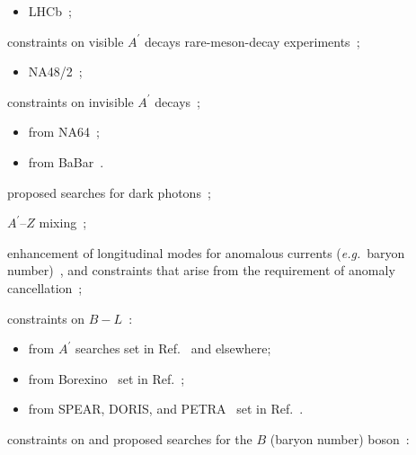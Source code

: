 \documentclass[a4paper,11pt]{article}
\def\aprime{\ensuremath{A^{\prime}}\xspace}
\begin{document}
\begin{list}{--}{\leftmargin=1em}
\begin{itemize}
    \item LHCb~\cite{Aaij:2017rft};
  \end{itemize}
  \item constraints on visible \aprime decays rare-meson-decay experiments~\cite{Bernardi:1985ny,MeijerDrees:1992kd,Archilli:2011zc,Gninenko:2011uv,Babusci:2012cr,Adlarson:2013eza,Agakishiev:2013fwl,Adare:2014mgk,Batley:2015lha,KLOE:2016lwm};
  \begin{itemize}
    \item NA48/2~\cite{Batley:2015lha};
  \end{itemize}
  \item constraints on invisible \aprime decays~\cite{Essig:2013vha,Davoudiasl:2014kua,Banerjee:2016tad,Lees:2017lec,Adler:2001xv,Adler:2004hp,Artamonov:2009sz,Banerjee:2017hhz};
    \begin{itemize}
      \item from NA64~\cite{Banerjee:2017hhz};
      \item from BaBar~\cite{Lees:2017lec}.
    \end{itemize}
  \item proposed searches for dark photons~\cite{Essig:2010xa,Freytsis:2009bh,Balewski:2013oza,Wojtsekhowski:2012zq,Beranek:2013yqa,Raggi:2014zpa,Echenard:2014lma,Battaglieri:2014hga,Alekhin:2015byh,Gardner:2015wea,Ilten:2015hya,Curtin:2014cca,He:2017ord,Kozaczuk:2017per,Ilten:2016tkc,Feng:2017uoz,Alexander:2017rfd};
  \item \aprime--$Z$ mixing~\cite{Barello:2015bhq,Cassel:2009pu,Cline:2014dwa};
  \item enhancement of longitudinal modes for anomalous currents ({\em e.g.}\ baryon number)~\cite{Dror:2017nsg,Dror:2017ehi,Ismail:2017fgq}, and constraints that arise from the requirement of anomaly cancellation~\cite{Dobrescu:2014fca};
  \item constraints on $B-L$~\cite{Bellini:2011rx,Harnik:2012ni,Carlson:1986cu,Frugiuele:2016rii,Ilten:2018dly}:
  \begin{itemize}
    \item from \aprime searches set in Ref.~\cite{Ilten:2018dly} and elsewhere;
      \item from Borexino~\cite{Bellini:2011rx} set in Ref.~\cite{Harnik:2012ni};
      \item from SPEAR, DORIS, and PETRA~\cite{Carlson:1986cu} set in Ref.~\cite{Frugiuele:2016rii}.
  \end{itemize}
  \item constraints on and proposed searches for the $B$ (baryon number) boson~\cite{Albrecht:1986ec,Aranda:1998fr,Prakhov:2008zz,Tulin:2014tya,Dror:2017ehi,Dror:2017nsg,Grygier:2017tzo,Aaij:2015tna,Aaij:2016qsm,AlaviHarati:2003mr,Artamonov:2008qb,Acciarri:1997im,Abreu:1996pa,Ilten:2018dly,Fanelli:2016utb,Dobrescu:2014fca}:

\end{list}
\end{document}
